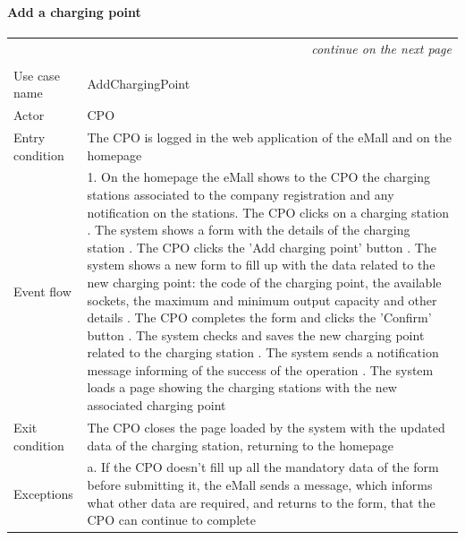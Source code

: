 \paragraph{Add a charging point}
\begin{center}
    \begin{longtable}{p{4cm} p{11cm}}
    \multicolumn{2}{r}{\itshape{continue on the next page}}\\
    \endfoot 
    \\
    \endlastfoot
    \hline
     Use case name &  AddChargingPoint\\
     \hline
     Actor & CPO \\
     \hline
     Entry condition & The CPO is logged in the web application of the eMall and on the homepage \\
     \hline
     Event flow & 1. On the homepage the eMall shows to the CPO the charging stations                   associated to the company registration and any notification on the                 stations\newline
                    2. The CPO clicks on a charging station \newline 
                    3. The system shows a form with the details of the charging station \newline
                    4. The CPO clicks the 'Add charging point' button \newline
                    5. The system shows a new form to fill up with the data related to the new charging point: the code of the charging point, the available sockets, the maximum and minimum output capacity and other details \newline
                    6. The CPO completes the form and clicks the 'Confirm' button \newline
                    7. The system checks and saves the new charging point related to the charging station \newline
                    8. The system sends a notification message informing of the success of the operation \newline
                    9. The system loads a page showing the charging stations with the new associated charging point\\
     \hline
     Exit condition &  The CPO closes the page loaded by the system with the updated data of the charging station, returning to the homepage \\
     \hline
     Exceptions &   a. If the CPO doesn't fill up all the mandatory data of the form                    before submitting it, the eMall sends a message, which informs                     what other data are required, and returns to the form, that the                    CPO can continue to complete \newline

\end{longtable}
\end{center}

